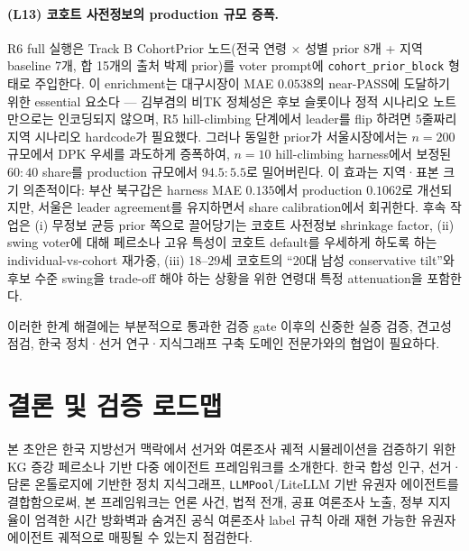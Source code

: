 \documentclass[11pt]{article}
\begin{document}
\paragraph{(L13) 코호트 사전정보의 production 규모 증폭.}
R6 full 실행은 Track B CohortPrior 노드(전국 연령 $\times$ 성별 prior 8개 + 지역 baseline 7개, 합 15개의 출처 박제 prior)를 voter prompt에 \texttt{cohort\_prior\_block} 형태로 주입한다. 이 enrichment는 대구시장이 MAE $0.0538$의 near-PASS에 도달하기 위한 essential 요소다 — 김부겸의 비TK 정체성은 후보 슬롯이나 정적 시나리오 노트만으로는 인코딩되지 않으며, R5 hill-climbing 단계에서 leader를 flip 하려면 5줄짜리 지역 시나리오 hardcode가 필요했다. 그러나 동일한 prior가 서울시장에서는 $n{=}200$ 규모에서 DPK 우세를 과도하게 증폭하여, $n{=}10$ hill-climbing harness에서 보정된 $60{:}40$ share를 production 규모에서 $94.5{:}5.5$로 밀어버린다. 이 효과는 지역·표본 크기 의존적이다: 부산 북구갑은 harness MAE $0.135$에서 production $0.1062$로 개선되지만, 서울은 leader agreement를 유지하면서 share calibration에서 회귀한다. 후속 작업은 (i) 무정보 균등 prior 쪽으로 끌어당기는 코호트 사전정보 shrinkage factor, (ii) swing voter에 대해 페르소나 고유 특성이 코호트 default를 우세하게 하도록 하는 individual-vs-cohort 재가중, (iii) 18--29세 코호트의 ``20대 남성 conservative tilt''와 후보 수준 swing을 trade-off 해야 하는 상황을 위한 연령대 특정 attenuation을 포함한다.

이러한 한계 해결에는 부분적으로 통과한 검증 gate 이후의 신중한 실증 검증, 견고성 점검, 한국 정치·선거 연구·지식그래프 구축 도메인 전문가와의 협업이 필요하다.

\section{결론 및 검증 로드맵}

본 초안은 한국 지방선거 맥락에서 선거와 여론조사 궤적 시뮬레이션을 검증하기 위한 KG 증강 페르소나 기반 다중 에이전트 프레임워크를 소개한다. 한국 합성 인구, 선거·담론 온톨로지에 기반한 정치 지식그래프, \texttt{LLMPool}/LiteLLM 기반 유권자 에이전트를 결합함으로써, 본 프레임워크는 언론 사건, 법적 전개, 공표 여론조사 노출, 정부 지지율이 엄격한 시간 방화벽과 숨겨진 공식 여론조사 label 규칙 아래 재현 가능한 유권자 에이전트 궤적으로 매핑될 수 있는지 점검한다.
\end{document}
